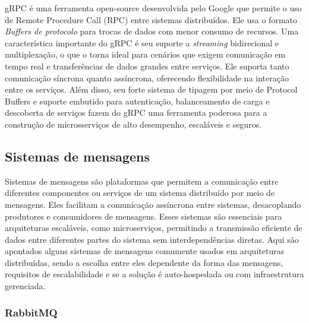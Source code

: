 gRPC é uma ferramenta open-source desenvolvida pelo Google que permite o uso de Remote Procedure Call (RPC) entre sistemas distribuídos. Ele usa o formato \emph{Buffers de protocolo} para trocas de dados com menor consumo de recursos. Uma característica importante do gRPC é seu suporte a \emph{streaming} bidirecional e multiplexação, o que o torna ideal para cenários que exigem comunicação em tempo real e transferências de dados grandes entre serviços. Ele suporta tanto comunicação síncrona quanto assíncrona, oferecendo flexibilidade na interação entre os serviços. 
Além disso, seu forte sistema de tipagem por meio de Protocol Buffers e suporte embutido para autenticação, balanceamento de carga e descoberta de serviços fazem do gRPC uma ferramenta poderosa para a construção de microsserviços de alto desempenho, escaláveis e seguros. \cite{grpc}

\subsection{Sistemas de mensagens}
Sistemas de mensagens são plataformas que permitem a comunicação entre diferentes componentes ou serviços de um sistema distribuído por meio de mensagens. Eles facilitam a comunicação assíncrona entre sistemas, desacoplando produtores e consumidores de mensagens. Esses sistemas são essenciais para arquiteturas escaláveis, como microserviços, permitindo a transmissão eficiente de dados entre diferentes partes do sistema sem interdependências diretas. Aqui são apontados alguns sistemas de mensagens comumente usados em arquiteturas distribuídas, sendo a escolha entre eles dependente da forma das mensagens, requisitos de escalabilidade e se a solução é auto-hospedada ou com infraestrutura gerenciada.

\subsubsection*{RabbitMQ}

